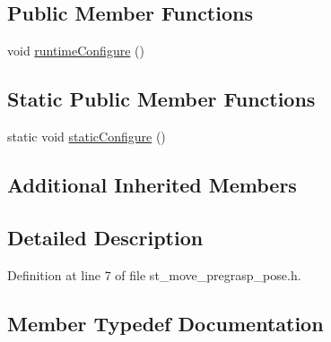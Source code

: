 \subsection*{Public Member Functions}
\begin{DoxyCompactItemize}
\item 
void \hyperlink{structsm__panda__moveit_1_1pick__states_1_1StMovePregraspPose_a86eeebab43891031e12c917e513e1ee9}{runtime\+Configure} ()
\end{DoxyCompactItemize}
\subsection*{Static Public Member Functions}
\begin{DoxyCompactItemize}
\item 
static void \hyperlink{structsm__panda__moveit_1_1pick__states_1_1StMovePregraspPose_a70150449245507a9770eca21a9d06ab7}{static\+Configure} ()
\end{DoxyCompactItemize}
\subsection*{Additional Inherited Members}


\subsection{Detailed Description}


Definition at line 7 of file st\+\_\+move\+\_\+pregrasp\+\_\+pose.\+h.



\subsection{Member Typedef Documentation}
\mbox{\label{structsm__panda__moveit_1_1pick__states_1_1StMovePregraspPose_a1189a52a5e39d3ca3db3e754597068a7}} 
